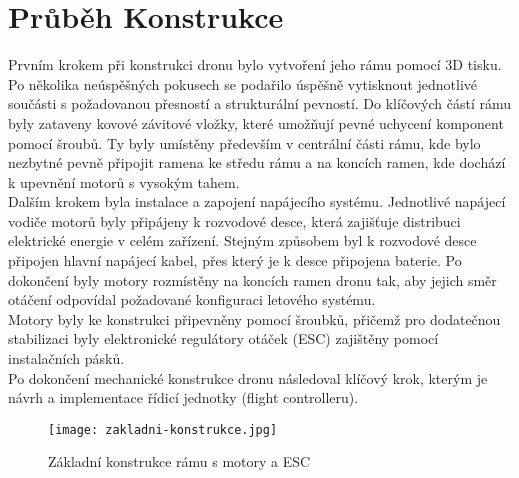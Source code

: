 \documentclass[12pt]{report}
\begin{document}
\chapter{Průběh Konstrukce}
Prvním krokem při konstrukci dronu bylo vytvoření jeho rámu pomocí 3D tisku. Po několika neúspěšných pokusech se podařilo úspěšně vytisknout jednotlivé součásti s požadovanou přesností a strukturální pevností. Do klíčových částí rámu byly zataveny kovové závitové vložky, které umožňují pevné uchycení komponent pomocí šroubů. Ty byly umístěny především v centrální části rámu, kde bylo nezbytné pevně připojit ramena ke středu rámu a na koncích ramen, kde dochází k upevnění motorů s vysokým tahem.\\
Dalším krokem byla instalace a zapojení napájecího systému. Jednotlivé napájecí vodiče motorů byly připájeny k rozvodové desce, která zajišťuje distribuci elektrické energie v celém zařízení. Stejným způsobem byl k rozvodové desce připojen hlavní napájecí kabel, přes který je k desce připojena baterie. Po dokončení byly motory rozmístěny na koncích ramen dronu tak, aby jejich směr otáčení odpovídal požadované konfiguraci letového systému.\\
Motory byly ke konstrukci připevněny pomocí šroubků, přičemž pro dodatečnou stabilizaci byly elektronické regulátory otáček (ESC) zajištěny pomocí instalačních pásků.\\
Po dokončení mechanické konstrukce dronu následoval klíčový krok, kterým je návrh a implementace řídicí jednotky (flight controlleru).
\begin{figure}[H]
	\centering
	\texttt{[image: zakladni-konstrukce.jpg]}
	\caption{Základní konstrukce rámu s motory a ESC}
	\label{fig:zakladni-konstrukce.jpg}
\end{figure}
\end{document}
